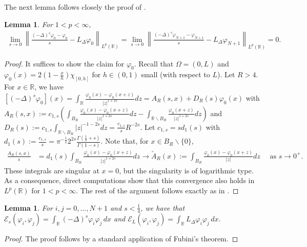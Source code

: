 \documentclass[11 pt]{article}
\newtheorem{lemma}[theorem]{Lemma}
\numberwithin{equation}{section}
\def\tilde{\widetilde}
\def\R{\mathbb{R}}
\def\cE{\mathcal{E}}
\begin{document}
The next lemma follows closely the proof of \cite[Theorem 1.1]{CW19}.
\begin{lemma}\label{phi0:conv}
For $1<p<\infty$,
\begin{align*}
\lim_{s\to 0}\left\|\frac{(-\Delta)^s \varphi_0-\varphi_0}{s}-L_\Delta \varphi_0    \right\|_{L^p(\R)}
=\lim_{s\to 0}\left\|\frac{(-\Delta)^s \varphi_{N+1}-\varphi_{N+1}}{s}-L_\Delta \varphi_{N+1}    \right\|_{L^p(\R)}
=0.
\end{align*}
\end{lemma}
\begin{proof}
It suffices to show the claim for $\varphi_0$. Recall that $\Omega=(0,L)$ and $\varphi_0(x)=2(1-\frac{x}{h})\chi_{[0,h]}$ for $h\in(0,1)$ small (with respect to $L$).  Let $R>4.$  For $x \in \mathbb{R}$, we have
$
\left[(-\Delta)^s \varphi_0\right](x)=\int_{\mathbb{R}} \frac{\varphi_0(x)-\varphi_0(x+z)}{|z|^{1+2s}} d z=A_R(s, x)+D_R(s) \varphi_0(x)
$
with $A_R(s, x):=c_{1, s}\left(\int_{B_R} \frac{\varphi_0(x)-\varphi_0(x+z)}{|z|^{1+2 s}} d z-\int_{\mathbb{R} \backslash B_R} \frac{\varphi_0(x+z)}{|z|^{1+2s}} d z\right)$
and $D_R(s):=c_{1, s} \int_{\mathbb{R} \backslash B_R}|z|^{-1-2 s} d z=\frac{c_{1, s}}{s}R^{-2 s}.$ Let $c_{1, s}=s d_1(s)$ with $d_1(s):=\frac{c_{1, s}}{s}=\pi^{-\frac{1}{2}} 2^{2 s} \frac{\Gamma\left(\frac{1}{2}+s\right)}{\Gamma(1-s)}.$  Note that, for $x\in B_R\backslash \{0\}$,
\begin{align*}
\frac{A_R(s, x)}{s} & =d_1(s) \int_{B_R} \frac{\varphi_0(x)-\varphi_0(x+z)}{|z|^{1+2 s}} d z
\rightarrow \tilde{A}_R(x):=\int_{B_R} \frac{\varphi_0(x)-\varphi_0(x+z)}{|z|} d z \quad \text { as } s \rightarrow 0^{+}.
\end{align*}
These integrals are singular at $x=0$, but the singularity is of logarithmic type.  As a consequence, direct computations show that this convergence also holds in $L^p(\R)$ for $1<p<\infty$.  The rest of the argument follows exactly as in \cite[Theorem 1.1]{CW19}.
\end{proof}

\begin{lemma}\label{ibyp:lem}
For $i,j=0,\ldots,N+1$ and $s<\frac{1}{4}$, we have that $\cE_s(\varphi_i,\varphi_j)=\int_{\R}(-\Delta)^s\varphi_i\varphi_j\, dx$ and $\cE_L(\varphi_i,\varphi_j)=\int_{\R}L_\Delta\varphi_i\varphi_j\, dx.$
\end{lemma}
\begin{proof}The proof follows by a standard application of Fubini's theorem. 
\end{proof}
\end{document}

